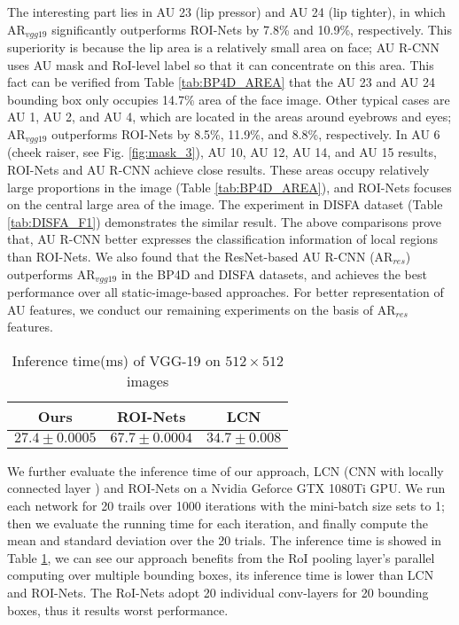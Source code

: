 \documentclass[5p,twocolumn]{elsarticle}
\begin{document}
The interesting part lies in AU 23 (lip pressor) and AU 24 (lip tighter), in which AR$_{vgg19}$ significantly outperforms ROI-Nets by 7.8\% and 10.9\%, respectively. This superiority is because the lip area is a relatively small area on face; AU R-CNN uses AU mask and RoI-level label so that it can concentrate on this area. This fact can be verified from Table \ref{tab:BP4D_AREA} that the AU 23 and AU 24 bounding box only occupies 14.7\% area of the face image. 
Other typical cases are AU 1, AU 2, and AU 4, which are located in the areas around eyebrows and eyes; AR$_{vgg19}$ outperforms ROI-Nets by 8.5\%, 11.9\%, and 8.8\%, respectively. In AU 6 (cheek raiser, see Fig. \ref{fig:mask_3}), AU 10, AU 12, AU 14, and AU 15 results, ROI-Nets and AU R-CNN achieve close results. These areas occupy relatively large proportions in the image (Table \ref{tab:BP4D_AREA}), and ROI-Nets focuses on the central large area of the image. The experiment in DISFA dataset (Table \ref{tab:DISFA_F1}) demonstrates the similar result. The above comparisons prove that, AU R-CNN better expresses the classification information of local regions than ROI-Nets. We also found that the ResNet-based AU R-CNN (AR$_{res}$) outperforms AR$_{vgg19}$ in the BP4D and DISFA datasets, and achieves the best performance over all static-image-based approaches. For better representation of AU features, we conduct our remaining experiments on the basis of AR$_{res}$ features.

\begin{table}[htp]
	\scriptsize	
	\setlength{\abovecaptionskip}{0pt}
	\setlength{\abovecaptionskip}{0pt}
	\caption{Inference time(ms) of VGG-19 on $512\times 512$ images}
	\label{tab:running_time}
	\centering
	\tabcolsep=0.15cm
	\begin{tabular}{ccc}
		\toprule
		Ours & ROI-Nets \cite{li2017action} & LCN \cite{taigman2014deepface} \\
		\midrule
		$27.4 \pm 0.0005$ & $67.7 \pm 0.0004$ & $34.7 \pm 0.008$ \\
		\bottomrule
	\end{tabular}
\end{table}
We further evaluate the inference time of our approach, LCN (CNN with locally connected layer \cite{taigman2014deepface}) and ROI-Nets on a Nvidia Geforce GTX 1080Ti GPU. We run each network for 20 trails over \num{1000} iterations with the mini-batch size sets to 1; then we evaluate the running time for each iteration, and finally compute the mean and standard deviation over the 20 trials. The inference time is showed in Table \ref{tab:running_time}, we can see our approach benefits from the RoI pooling layer's parallel computing over multiple bounding boxes, its inference time is lower than LCN and ROI-Nets. The RoI-Nets adopt 20 individual conv-layers for 20 bounding boxes, thus it results worst performance.
\end{document}
